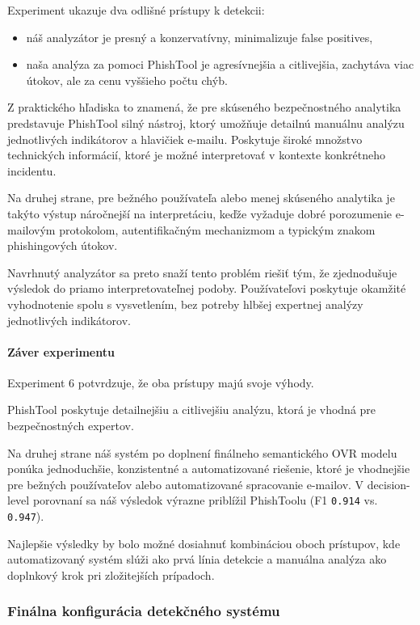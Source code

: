 \documentclass[conference]{IEEEtran}
\begin{document}
Experiment ukazuje dva odlišné prístupy k detekcii:

\begin{itemize}
    \item náš analyzátor je presný a konzervatívny,
    minimalizuje false positives,
    \item naša analýza za pomoci PhishTool je agresívnejšia a citlivejšia,
    zachytáva viac útokov, ale za cenu vyššieho počtu chýb.
\end{itemize}

Z praktického hľadiska to znamená, že pre skúseného bezpečnostného
analytika predstavuje PhishTool silný nástroj, ktorý umožňuje detailnú
manuálnu analýzu jednotlivých indikátorov a hlavičiek e-mailu.
Poskytuje široké množstvo technických informácií, ktoré je možné
interpretovať v kontexte konkrétneho incidentu.

Na druhej strane, pre bežného používateľa alebo menej skúseného analytika
je takýto výstup náročnejší na interpretáciu, keďže vyžaduje dobré
porozumenie e-mailovým protokolom, autentifikačným mechanizmom
a typickým znakom phishingových útokov.

Navrhnutý analyzátor sa preto snaží tento problém riešiť tým, že
zjednodušuje výsledok do priamo interpretovateľnej podoby.
Používateľovi poskytuje okamžité vyhodnotenie spolu s vysvetlením,
bez potreby hlbšej expertnej analýzy jednotlivých indikátorov.

\paragraph{Záver experimentu}

Experiment 6 potvrdzuje, že oba prístupy majú svoje výhody.

PhishTool poskytuje detailnejšiu a citlivejšiu analýzu,
ktorá je vhodná pre bezpečnostných expertov.

Na druhej strane náš systém po doplnení finálneho semantického OVR modelu ponúka jednoduchšie,
konzistentné a automatizované riešenie,
ktoré je vhodnejšie pre bežných používateľov alebo
automatizované spracovanie e-mailov. V decision-level porovnaní sa náš výsledok
výrazne priblížil PhishToolu (F1 \texttt{0.914} vs. \texttt{0.947}).

Najlepšie výsledky by bolo možné dosiahnuť kombináciou oboch prístupov,
kde automatizovaný systém slúži ako prvá línia detekcie
a manuálna analýza ako doplnkový krok pri zložitejších prípadoch.


\subsubsection{Finálna konfigurácia detekčného systému}
\end{document}
